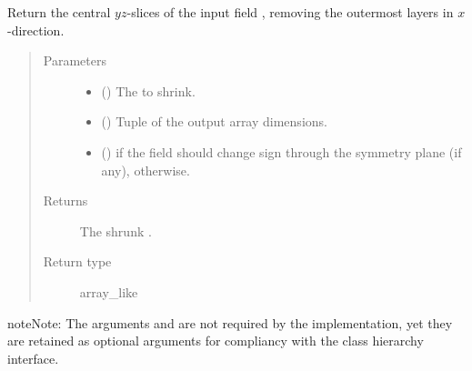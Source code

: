 \documentclass[letterpaper,10pt,english]{sphinxmanual}
\begin{document}
\begin{fulllineitems}
\begin{fulllineitems}
\label{\detokenize{api:dycore.horizontal_boundary_periodic.PeriodicYZ.from_computational_to_physical_domain}}
Return the central \(yz\)-slices of the input field , removing the  outermost
layers in \(x\)-direction.
\begin{quote}\begin{description}
\item[{Parameters}] \leavevmode\begin{itemize}
\item {} 
 () \textendash{} The  to shrink.

\item {} 
 () \textendash{} Tuple of the output array dimensions.

\item {} 
 () \textendash{}  if the field should change sign through the symmetry plane (if any),  otherwise.

\end{itemize}

\item[{Returns}] \leavevmode
The shrunk .

\item[{Return type}] \leavevmode
array\_like

\end{description}\end{quote}

\begin{sphinxadmonition}{note}{Note:}
The arguments  and  are not required by the implementation,
yet they are retained as optional arguments for compliancy with the class hierarchy interface.
\end{sphinxadmonition}

\end{fulllineitems}


\end{fulllineitems}
\end{document}

